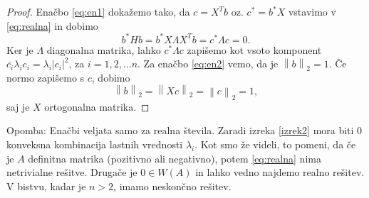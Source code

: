 \documentclass[12pt,a4paper]{amsart}
\theoremstyle{definition}
\theoremstyle{plain}
\newcommand{\abs}[1]{ \left\lvert#1\right\rvert}
\newcommand{\norm}[1]{\left\lVert#1\right\rVert}
\begin{document}
\begin{proof}
Enačbo \eqref{eq:en1}  dokažemo tako, da $c=X^Tb$ oz. $c^\ast =b^\ast X$ vstavimo v \eqref{eq:realna} in dobimo $$b^\ast Hb=b^\ast X\Lambda X^T b= c^\ast \Lambda c=0.$$ Ker je $\Lambda$ diagonalna matrika, lahko $c^\ast \Lambda c$ zapišemo kot vsoto komponent $\bar{c_i}\lambda_i c_i=\lambda_i\abs{c_i}^2$, za $i=1,2,...n$.
Za enačbo \eqref{eq:en2} vemo, da je $\norm{b}_2=1$. Če normo zapišemo s $c$, dobimo $$\norm{b}_2=\norm{Xc}_2=\norm{c}_2=1,$$ saj je $X$ ortogonalna matrika.

\end{proof}
Opomba: Enačbi veljata samo za realna števila. Zaradi  izreka \ref{izrek2} mora biti 0 konveksna kombinacija lastnih vrednosti $\lambda_i$. Kot smo že videli, to pomeni, da če je $A$ definitna matrika (pozitivno ali negativno), potem \eqref{eq:realna}
nima netrivialne rešitve. Drugače je $0 \in W(A)$ in lahko vedno najdemo realno rešitev. V bistvu, kadar je $n>2$,  imamo neskončno rešitev. 
\end{document}
